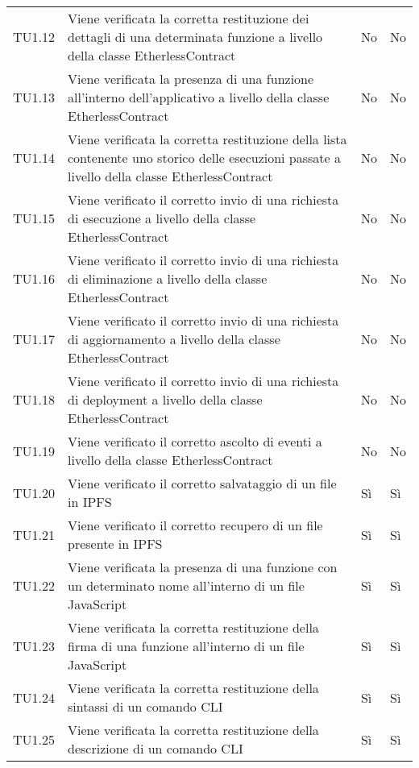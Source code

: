 \begin{longtable}{
		>{\centering}p{}
		>{}p{}
		>{\centering}p{}
		>{\centering}p{} }
		TU1.12 &
		Viene verificata la corretta restituzione dei dettagli di una determinata funzione a livello della classe EtherlessContract &
		No &
		No \tabularnewline

		TU1.13 &
		Viene verificata la presenza di una funzione all’interno dell’applicativo a livello della classe EtherlessContract &
		No &
		No \tabularnewline

		TU1.14 &
		Viene verificata la corretta restituzione della lista contenente uno storico delle esecuzioni passate a livello della classe EtherlessContract &
		No &
		No \tabularnewline

		TU1.15 &
		Viene verificato il corretto invio di una richiesta di esecuzione a livello della classe EtherlessContract &
		No &
		No \tabularnewline

		TU1.16 &
		Viene verificato il corretto invio di una richiesta di eliminazione a livello della classe EtherlessContract &
		No &
		No \tabularnewline

		TU1.17 &
		Viene verificato il corretto invio di una richiesta di aggiornamento a livello della classe EtherlessContract &
		No &
		No \tabularnewline

		TU1.18 &
		Viene verificato il corretto invio di una richiesta di deployment a livello della classe EtherlessContract &
		No &
		No \tabularnewline

		TU1.19 &
		Viene verificato il corretto ascolto di eventi a livello della classe EtherlessContract &
		No &
		No \tabularnewline

		TU1.20 &
		Viene verificato il corretto salvataggio di un file in IPFS &
		Sì &
		Sì \tabularnewline

		TU1.21 &
		Viene verificato il corretto recupero di un file presente in IPFS &
		Sì &
		Sì \tabularnewline

		TU1.22 &
		Viene verificata la presenza di una funzione con un determinato nome all’interno di un file JavaScript &
		Sì &
		Sì \tabularnewline

		TU1.23 &
		Viene verificata la corretta restituzione della firma di una funzione all’interno di un file JavaScript &
		Sì &
		Sì \tabularnewline

		TU1.24 &
		Viene verificata la corretta restituzione della sintassi di un comando CLI &
		Sì &
		Sì \tabularnewline

		TU1.25 &
		Viene verificata la corretta restituzione della descrizione di un comando CLI &
		Sì &
		Sì \tabularnewline
		
\end{longtable}
